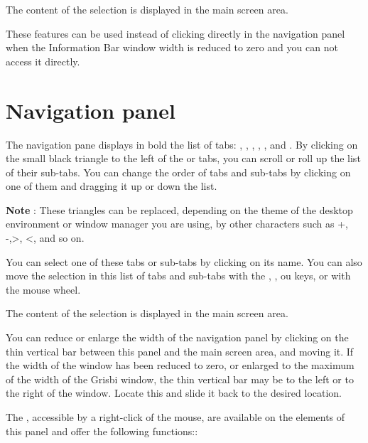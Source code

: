 The content of the selection is displayed in the main screen area.

These features can be used instead of clicking directly in the navigation panel when the Information Bar window width is reduced to zero and you can not access it directly.


\section{Navigation panel\label{home-accounting}}

The navigation pane displays in bold the list of tabs:  , , , , ,  and . By clicking on the small black triangle to the left of the   or  tabs,  you can scroll or roll up the list of their sub-tabs. You can change the order of tabs and sub-tabs by clicking on one of them and dragging it up or down the list.

\textbf{Note} : These triangles can be replaced, depending on the theme of the desktop environment or window manager you are using, by other characters such as +, -,>, <, and so on.


You can select one of these tabs or sub-tabs by clicking on its name. You can also move the selection in this list of tabs and sub-tabs with the , ,  ou  keys, or with the mouse wheel. 

The content of the selection is displayed in the main screen area.

You can reduce or enlarge the width of the navigation panel by clicking on the thin vertical bar between this panel and the main screen area, and moving it. If the width of the window has been reduced to zero, or enlarged to the maximum of the width of the Grisbi window, the thin vertical bar may be to the left or to the right of the window.  Locate this and slide it back to the desired location.


The ,  accessible by a right-click of the mouse, are available on the elements of this panel and offer the following functions::

